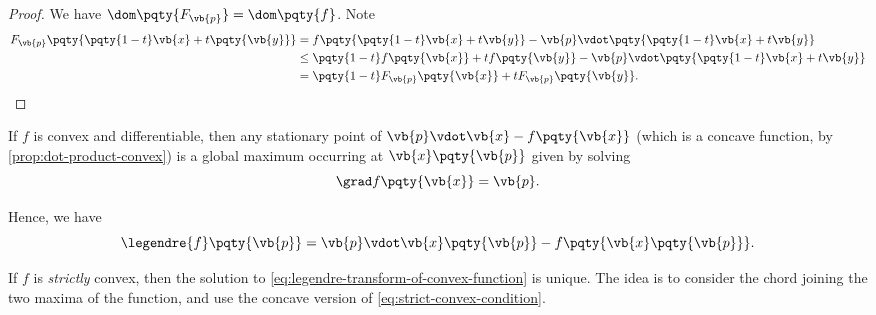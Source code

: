 \begin{proof}
    We have \(\dom \pqty{F_{\vb{p}}} = \dom \pqty{f}\). Note
    \begin{align*}
        F_{\vb{p}} \pqty{\pqty{1 - t} \vb{x} + t \pqty{\vb{y}}} &= f\pqty{\pqty{1 - t} \vb{x} + t \vb{y}} - \vb{p} \vdot \pqty{\pqty{1 - t} \vb{x} + t \vb{y}} \\
        &\leq \pqty{1 - t} f \pqty{\vb{x}} + t f \pqty{\vb{y}} - \vb{p} \vdot \pqty{\pqty{1 - t} \vb{x} + t \vb{y}} \\
        &= \pqty{1 - t} F_{\vb{p}} \pqty{\vb{x}} + t F_{\vb{p}} \pqty{\vb{y}}.
    \end{align*}
\end{proof}

\begin{corollary}
    \label{cor:legendre-transform-of-convex-function}
    If \(f\) is convex and differentiable, then any stationary point of \(\vb{p} \vdot \vb{x} - f \pqty{\vb{x}}\) (which is a concave function, by \autoref{prop:dot-product-convex}) is a global maximum occurring at \(\vb{x} \pqty{\vb{p}}\) given by solving
    \begin{equation}
        \grad f\pqty{\vb{x}} = \vb{p}.
        \label{eq:legendre-transform-of-convex-function}
    \end{equation}

    Hence, we have
    \[
        \legendre{f} \pqty{\vb{p}} = \vb{p} \vdot \vb{x} \pqty{\vb{p}} - f\pqty{\vb{x} \pqty{\vb{p}}}.
    \]
\end{corollary}

\begin{remark}
    If \(f\) is \emph{strictly} convex, then the solution to \eqref{eq:legendre-transform-of-convex-function} is unique. The idea is to consider the chord joining the two maxima of the function, and use the concave version of \eqref{eq:strict-convex-condition}.
\end{remark}

